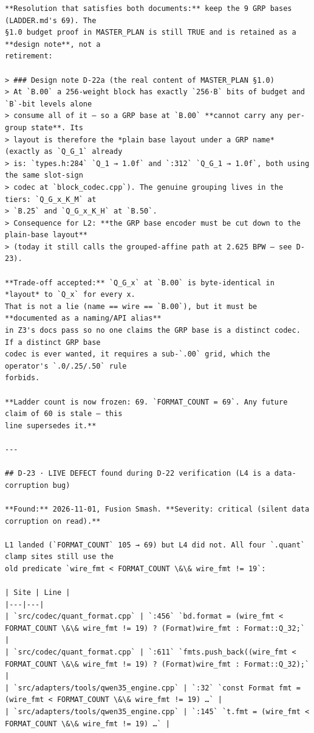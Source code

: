 \begin{verbatim}
**Resolution that satisfies both documents:** keep the 9 GRP bases (LADDER.md's 69). The
§1.0 budget proof in MASTER_PLAN is still TRUE and is retained as a **design note**, not a
retirement:

> ### Design note D-22a (the real content of MASTER_PLAN §1.0)
> At `B.00` a 256-weight block has exactly `256·B` bits of budget and `B`-bit levels alone
> consume all of it — so a GRP base at `B.00` **cannot carry any per-group state**. Its
> layout is therefore the *plain base layout under a GRP name* (exactly as `Q_G_1` already
> is: `types.h:284` `Q_1 → 1.0f` and `:312` `Q_G_1 → 1.0f`, both using the same slot-sign
> codec at `block_codec.cpp`). The genuine grouping lives in the tiers: `Q_G_x_K_M` at
> `B.25` and `Q_G_x_K_H` at `B.50`.
> Consequence for L2: **the GRP base encoder must be cut down to the plain-base layout**
> (today it still calls the grouped-affine path at 2.625 BPW — see D-23).

**Trade-off accepted:** `Q_G_x` at `B.00` is byte-identical in *layout* to `Q_x` for every x.
That is not a lie (name == wire == `B.00`), but it must be **documented as a naming/API alias**
in Z3's docs pass so no one claims the GRP base is a distinct codec. If a distinct GRP base
codec is ever wanted, it requires a sub-`.00` grid, which the operator's `.0/.25/.50` rule
forbids.

**Ladder count is now frozen: 69. `FORMAT_COUNT = 69`. Any future claim of 60 is stale — this
line supersedes it.**

---

## D-23 · LIVE DEFECT found during D-22 verification (L4 is a data-corruption bug)

**Found:** 2026-11-01, Fusion Smash. **Severity: critical (silent data corruption on read).**

L1 landed (`FORMAT_COUNT` 105 → 69) but L4 did not. All four `.quant` clamp sites still use the
old predicate `wire_fmt < FORMAT_COUNT \&\& wire_fmt != 19`:

| Site | Line |
|---|---|
| `src/codec/quant_format.cpp` | `:456` `bd.format = (wire_fmt < FORMAT_COUNT \&\& wire_fmt != 19) ? (Format)wire_fmt : Format::Q_32;` |
| `src/codec/quant_format.cpp` | `:611` `fmts.push_back((wire_fmt < FORMAT_COUNT \&\& wire_fmt != 19) ? (Format)wire_fmt : Format::Q_32);` |
| `src/adapters/tools/qwen35_engine.cpp` | `:32` `const Format fmt = (wire_fmt < FORMAT_COUNT \&\& wire_fmt != 19) …` |
| `src/adapters/tools/qwen35_engine.cpp` | `:145` `t.fmt = (wire_fmt < FORMAT_COUNT \&\& wire_fmt != 19) …` |


\end{verbatim}
